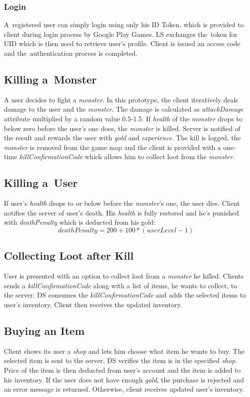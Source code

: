		\subsubsection*{Login}
		A~registered user can simply login using only his ID Token, which is provided to client during login process by Google Play Games. LS exchanges the~token for UID which is then used to retrieve user's profile. Client is issued an access code and the~authentication process is completed.
	
	\subsection{Killing a~Monster}
	A user decides to fight a \textit{monster}. In this prototype, the client iteratively deals damage to the user and the \textit{monster}. The damage is calculated as \textit{attackDamage} attribute multiplied by a random value 0.5-1.5. If \textit{health} of the \textit{monster} drops to below zero before the user's one does, the \textit{monster} is killed. Server is notified of the result and rewards the user with \textit{gold} and \textit{experience}. The kill is logged, the \textit{monster} is removed from the game map and the client is provided with a one-time \textit{killConfirmationCode} which allows him to collect loot from the \textit{monster}.
		
	\subsection{Killing a~User}
	If user's \textit{health} drops to or below before the \textit{monster}'s one, the user dies. Client notifies the server of user's death. His \textit{health} is fully restored and he's punished with \textit{deathPenalty} which is deducted from his gold:  \[ deathPenalty = 200 + 100 * (userLevel - 1) \]
	
	\subsection{Collecting Loot after Kill}
	User is presented with an option to collect loot from a \textit{monster} he killed. Clients sends a \textit{killConfirmationCode} along with a list of items, he wants to collect, to the server. DS consumes the \textit{killConfirmationCode} and adds the selected items to user's inventory. Client then receives the updated inventory.
	
	\subsection{Buying an Item}
	Client shows its user a \textit{shop} and lets him choose what item he wants to buy. The selected item is sent to the server. DS verifies the item is in the specified \textit{shop}. Price of the item is then deducted from user's account and the item is added to his inventory. If the user does not have enough \textit{gold}, the purchase is rejected and an error message is returned. Otherwise, client receives updated user's inventory.
	
